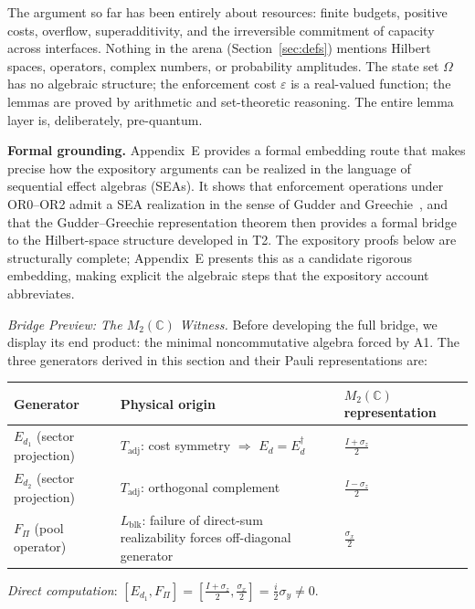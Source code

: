 \documentclass[11pt]{article}
\theoremstyle{remark}
\begin{document}

The argument so far has been entirely about resources: finite budgets, positive costs, overflow, superadditivity, and the irreversible commitment of capacity across interfaces.  Nothing in the arena (Section~\ref{sec:defs}) mentions Hilbert spaces, operators, complex numbers, or probability amplitudes.  The state set $\Omega$ has no algebraic structure; the enforcement cost $\varepsilon$ is a real-valued function; the lemmas are proved by arithmetic and set-theoretic reasoning.  The entire lemma layer is, deliberately, pre-quantum.

\textbf{Formal grounding.}\label{sec:qskel}  Appendix~E provides a formal embedding route that makes precise how the expository arguments can be realized in the language of sequential effect algebras (SEAs).  It shows that enforcement operations under OR0--OR2 admit a SEA realization in the sense of Gudder and Greechie~\cite{GudderGreechie2002}, and that the Gudder--Greechie representation theorem then provides a formal bridge to the Hilbert-space structure developed in T2.  The expository proofs below are structurally complete; Appendix~E presents this as a candidate rigorous embedding, making explicit the algebraic steps that the expository account abbreviates.


\medskip\noindent\textit{Bridge Preview: The $M_2(\mathbb{C})$ Witness.}
Before developing the full bridge, we display its end product: the minimal noncommutative algebra forced by A1.  The three generators derived in this section and their Pauli representations are:
\begin{center}
\smallskip
\renewcommand{\arraystretch}{1.4}
\begin{tabular}{@{}lll@{}}
\textbf{Generator} & \textbf{Physical origin} & \textbf{$M_2(\mathbb{C})$ representation} \\[2pt]
\hline\noalign{\smallskip}
$E_{d_1}$ (sector projection) & $T_{\mathrm{adj}}$: cost symmetry $\Rightarrow$ $E_d = E_d^\dagger$ & $\frac{I + \sigma_z}{2}$ \\[3pt]
$E_{d_2}$ (sector projection) & $T_{\mathrm{adj}}$: orthogonal complement & $\frac{I - \sigma_z}{2}$ \\[3pt]
$F_\Pi$ (pool operator) & $L_{\mathrm{blk}}$: failure of direct-sum realizability forces off-diagonal generator & $\frac{\sigma_x}{2}$ \\
\end{tabular}
\label{tab:bridge_generators}
\end{center}
\textit{Direct computation}: $[E_{d_1}, F_\Pi] = [\frac{I+\sigma_z}{2}, \frac{\sigma_x}{2}] = \frac{i}{2}\sigma_y \ne 0$.
\end{document}
